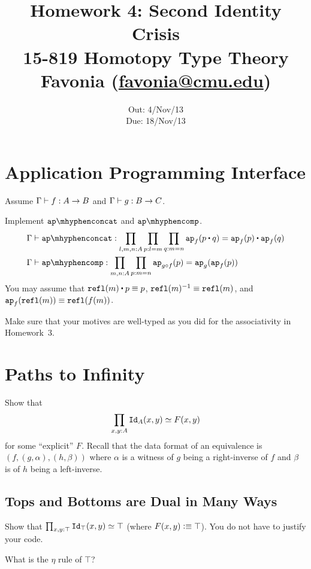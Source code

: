 \documentclass[12pt]{article}
\title{\Large\textbf{
  Homework 4: Second Identity Crisis}
\normalsize\\
15-819 Homotopy Type Theory\\
Favonia (\href{mailto:favonia@cmu.edu}{favonia@cmu.edu})}
\author{}
\date{%
Out: 4/Nov/13\\
Due: 18/Nov/13
}
\begin{document}
\maketitle

\section{Application Programming Interface}

Assume
$\Gamma \vdash f : A \to B$ and
$\Gamma \vdash g : B \to C$.

\begin{task}
  Implement $\apconcat$ and $\apcomp$.
  \begin{align*}
    &\ctx \entails \apconcat : \prod_{l,m,n:A}\prod_{p:l=m}\prod_{q:m=n}\ap_f(p \concat q) = \ap_f(p) \concat \ap_f(q)
    \\
    &\ctx \entails \apcomp : \prod_{m,n:A}\prod_{p:m=n}\ap_{g \comp f}(p) = \ap_g(\ap_f(p))
  \end{align*}
  You may assume that $\refl(m) \concat p \jdeq p$, $\mathtt{refl}(m)^{-1} \equiv \mathtt{refl}(m)$,
  and $\mathtt{ap}_f(\mathtt{refl}(m)) \equiv \mathtt{refl}(f(m))$.
  \begin{hint}
    Make sure that your motives are well-typed
    as you did for the associativity in Homework~3.
  \end{hint}
\end{task}

\section{Paths to Infinity}

Show that
\[
  \prod_{x,y:A} \mathtt{Id}_A(x,y) \simeq F(x,y)
\]
for some ``explicit'' $F$.
Recall that the data format of an equivalence is
$(f,(g,\alpha),(h,\beta))$
where $\alpha$ is a witness of $g$ being a right-inverse of $f$
and $\beta$ is of $h$ being a left-inverse.

\subsection{Tops and Bottoms are Dual in Many Ways}

\begin{task}
  Show that $\prod_{x,y:\top} \mathtt{Id}_\top(x,y) \simeq \top$
  (where $F(x,y) \vcentcolon\equiv \top$).
  You do not have to justify your code.
  \begin{hint}
    What is the $\eta$ rule of $\top$?
  \end{hint}
\end{task}
\end{document}
